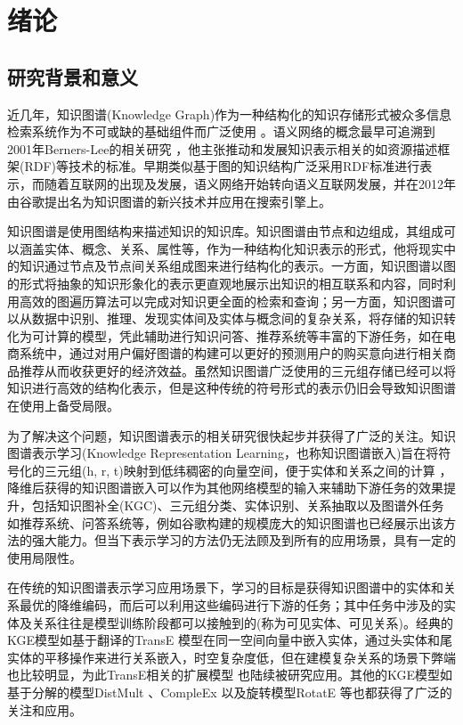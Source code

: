 \chapter{绪论}

\section{研究背景和意义}
近几年，知识图谱(Knowledge Graph)作为一种结构化的知识存储形式被众多信息检索系统作为不可或缺的基础组件而广泛使用 \cite{zou2020survey}。语义网络的概念最早可追溯到2001年Berners-Lee的相关研究 \cite{berners2001semantic}，他主张推动和发展知识表示相关的如资源描述框架(RDF)等技术的标准。早期类似基于图的知识结构广泛采用RDF标准进行表示，而随着互联网的出现及发展，语义网络开始转向语义互联网发展，并在2012年由谷歌提出名为知识图谱的新兴技术并应用在搜索引擎上。

知识图谱是使用图结构来描述知识的知识库。知识图谱由节点和边组成，其组成可以涵盖实体、概念、关系、属性等，作为一种结构化知识表示的形式，他将现实中的知识通过节点及节点间关系组成图来进行结构化的表示。一方面，知识图谱以图的形式将抽象的知识形象化的表示更直观地展示出知识的相互联系和内容，同时利用高效的图遍历算法可以完成对知识更全面的检索和查询；另一方面，知识图谱可以从数据中识别、推理、发现实体间及实体与概念间的复杂关系，将存储的知识转化为可计算的模型，凭此辅助进行知识问答、推荐系统等丰富的下游任务，如在电商系统中，通过对用户偏好图谱的构建可以更好的预测用户的购买意向进行相关商品推荐从而收获更好的经济效益。虽然知识图谱广泛使用的三元组存储已经可以将知识进行高效的结构化表示，但是这种传统的符号形式的表示仍旧会导致知识图谱在使用上备受局限。

为了解决这个问题，知识图谱表示的相关研究很快起步并获得了广泛的关注。知识图谱表示学习(Knowledge Representation Learning，也称知识图谱嵌入)旨在将符号化的三元组(h, r, t)映射到低纬稠密的向量空间，便于实体和关系之间的计算 \cite{JSYJ202103003}，降维后获得的知识图谱嵌入可以作为其他网络模型的输入来辅助下游任务的效果提升，包括知识图补全(KGC)、三元组分类、实体识别、关系抽取以及图谱外任务如推荐系统、问答系统等，例如谷歌构建的规模庞大的知识图谱也已经展示出该方法的强大能力。但当下表示学习的方法仍无法顾及到所有的应用场景，具有一定的使用局限性。

在传统的知识图谱表示学习应用场景下，学习的目标是获得知识图谱中的实体和关系最优的降维编码，而后可以利用这些编码进行下游的任务；其中任务中涉及的实体及关系往往是模型训练阶段都可以接触到的(称为可见实体、可见关系)。经典的KGE模型如基于翻译的TransE \cite{bordes2013translating}模型在同一空间向量中嵌入实体，通过头实体和尾实体的平移操作来进行关系嵌入，时空复杂度低，但在建模复杂关系的场景下弊端也比较明显，为此TransE相关的扩展模型 \cite{wang2014knowledge}也陆续被研究应用。其他的KGE模型如基于分解的模型DistMult \cite{yang2014embedding}、CompleEx \cite{trouillon2016complex}以及旋转模型RotatE \cite{sun2019rotate}等也都获得了广泛的关注和应用。

